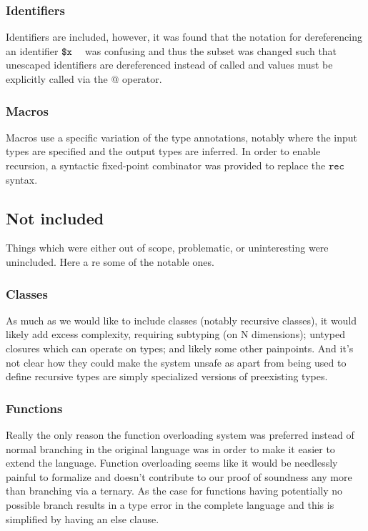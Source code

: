 \documentclass{article}
\begin{document}
\subsubsection{Identifiers}
Identifiers are included, however, it was found that the notation for 
dereferencing an identifier $\texttt{\$x}~\texttt{~}$ was confusing and
thus the subset was changed such that unescaped identifiers are dereferenced instead of 
called and values must be explicitly called via the $\texttt{@}$
operator.

\subsubsection{Macros}
Macros use a specific variation of the type annotations, notably where the
input types are specified and the output types are inferred. In order to 
enable recursion, a syntactic fixed-point combinator was provided to replace
the $\texttt{rec}$ syntax.

\subsection{Not included}
Things which were either out of scope, problematic, or uninteresting were unincluded. Here a re some of the notable ones.

\subsubsection{Classes}
As much as we would like to include classes (notably recursive classes), it 
would likely add excess complexity, requiring subtyping (on N dimensions); 
untyped closures which can operate on types; and likely some other painpoints.
And it's not clear how they could make the system unsafe as apart from being
used to define recursive types are simply specialized versions of preexisting
types.

\subsubsection{Functions}
Really the only reason the function overloading system was preferred instead
of normal branching in the original language was in order to make it easier 
to extend the language. Function overloading seems like it would be needlessly
painful to formalize and doesn't contribute to our proof of soundness any more
than branching via a ternary. As the case for functions having potentially no
possible branch results in a type error in the complete language and this is
simplified by having an else clause.
\end{document}
